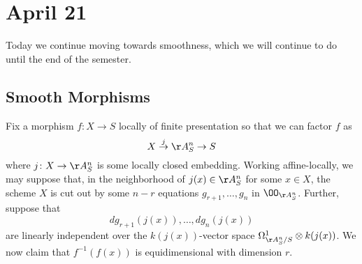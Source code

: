 \documentclass[../notes.tex]{subfiles}
\begin{document}
\section{April 21}

Today we continue moving towards smoothness, which we will continue to do until the end of the semester.

\subsection{Smooth Morphisms}
Fix a morphism $f\colon X\to S$ locally of finite presentation so that we can factor $f$ as
\[X\stackrel j\to\AA^n_S\to S\]
where $j\colon X\to\AA^n_S$ is some locally closed embedding. Working affine-locally, we may suppose that, in the neighborhood of $j(x)\in\AA^n_S$ for some $x\in X$, the scheme $X$ is cut out by some $n-r$ equations $g_{r+1},\ldots,g_n$ in $\OO_{\AA^n_S}$. Further, suppose that
\[dg_{r+1}(j(x)),\ldots,dg_n(j(x))\]
are linearly independent over the $k(j(x))$-vector space $\Omega^1_{\AA^n_S/S}\otimes k(j(x))$. We now claim that $f^{-1}(f(x))$ is equidimensional with dimension $r$.
\end{document}
